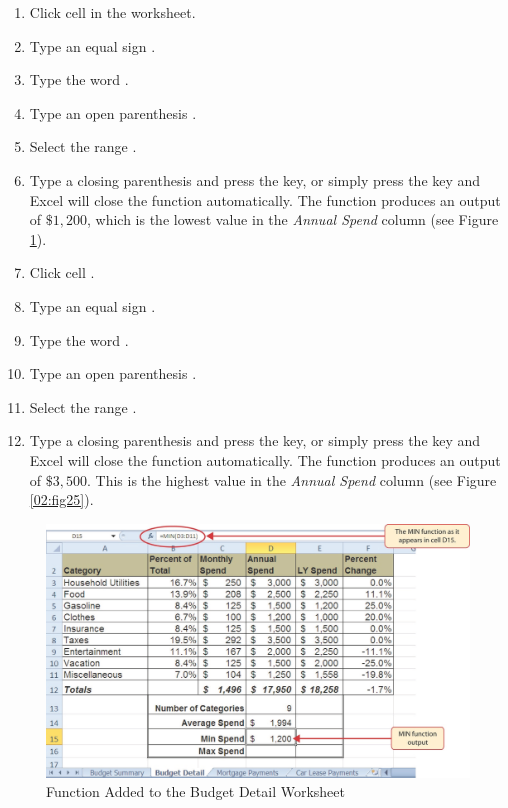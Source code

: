 \begin{enumbox}
	\begin{enumerate}
		\item Click cell  in the  worksheet.
		\item Type an equal sign \fmtTyping{=}.
		\item Type the word .
		\item Type an open parenthesis \fmtTyping{(}.
		\item Select the range .
		\item Type a closing parenthesis \fmtTyping{)} and press the  key, or simply press the  key and Excel will close the function automatically. The  function produces an output of $ \$1,200 $, which is the lowest value in the \textit{Annual Spend} column (see Figure \ref{02:fig24}).
		\item Click cell .
		\item Type an equal sign \fmtTyping{=}.
		\item Type the word .
		\item Type an open parenthesis \fmtTyping{(}.
		\item Select the range .
		\item Type a closing parenthesis \fmtTyping{)} and press the  key, or simply press the  key and Excel will close the function automatically. The  function produces an output of $ \$3,500 $. This is the highest value in the \textit{Annual Spend} column (see Figure \ref{02:fig25}).
	\end{enumerate}
\end{enumbox}

\begin{figure}[H]
	\centering
	\includegraphics[width=\maxwidth{.95\linewidth}]{gfx/ch02_fig24}
	\caption{ Function Added to the Budget Detail Worksheet}
	\label{02:fig24}
\end{figure}

